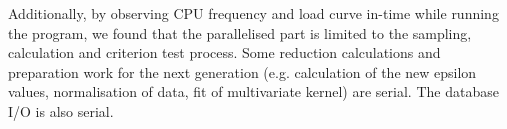 Additionally, by observing CPU frequency and load curve in-time while running the program, we found that the parallelised part is limited to the sampling, calculation and criterion test process. Some reduction calculations and preparation work for the next generation (e.g. calculation of the new epsilon values, normalisation of data, fit of multivariate kernel) are serial. The database I/O is also serial.








